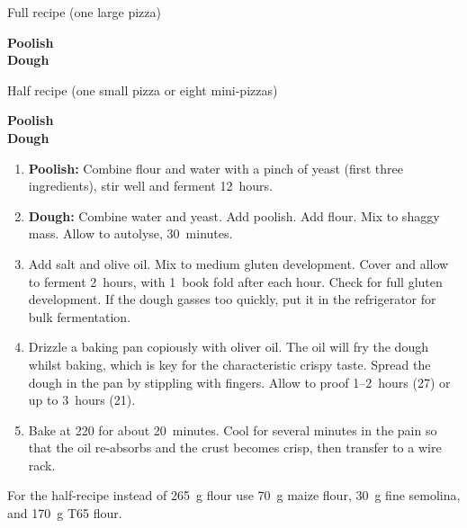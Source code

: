 
\begin{minipage}{.45\textwidth}
  Full recipe (one large pizza)
  
  \begin{ingredients}
    \textbf{Poolish}\\
    \textbf{Dough}\\
  \end{ingredients}
\end{minipage}
\begin{minipage}{.45\textwidth}
  Half recipe (one small pizza or eight mini-pizzas)
  
  \begin{ingredients}
    \textbf{Poolish}\\
    \textbf{Dough}\\
  \end{ingredients}
\end{minipage}

\begin{recipe}
  \begin{enumerate}

  \item \textbf{Poolish:} Combine flour and water with a pinch of
    yeast (first three ingredients), stir well and ferment 12~hours.
    
  \item \textbf{Dough:} Combine water and yeast.  Add poolish.  Add
    flour.  Mix to shaggy mass.  Allow to autolyse, 30~minutes.
    
  \item Add salt and olive oil.  Mix to medium gluten development.
    Cover and allow to ferment 2\fracH~hours, with 1~book fold after
    each hour.  Check for full gluten development.  If the dough
    gasses too quickly, put it in the refrigerator for bulk fermentation.
    
  \item Drizzle a baking pan copiously with oliver oil.  The oil will
    fry the dough whilst baking, which is key for the characteristic
    crispy taste.  Spread the dough in the pan by stippling with
    fingers.  Allow to proof 1\fracH--2~hours (27\degreeC) or up to
    3~hours (21\degreeC).
    
  \item Bake at 220\degreeC{} for about 20~minutes.  Cool for several
    minutes in the pain so that the oil re-absorbs and the crust
    becomes crisp, then transfer to a wire rack.

  \end{enumerate}
\end{recipe}


For the half-recipe instead of 265~g flour use 70~g maize flour, 30~g
fine semolina, and 170~g T65 flour.

